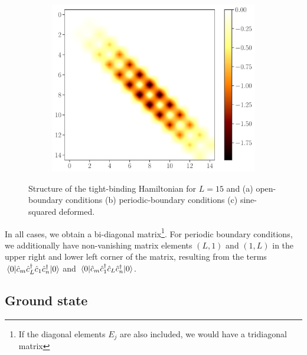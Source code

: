 \documentclass[11pt, a4paper, oneside]{book}
\theoremstyle{definition} %
\begin{document}
\begin{figure}[h]
\begin{subfigure}[b]{0.31\textwidth}
			\includegraphics[width = \textwidth]{ColorMapMatrix_SSD}	
			\caption{}
		\end{subfigure}
		\caption{Structure of the tight-binding Hamiltonian for $L = 15$ and (a) open-boundary conditions (b) periodic-boundary conditions (c) sine-squared deformed.}
		\label{fig:matrix_representation_Hamiltonian}
\end{figure}
In all cases, we obtain a bi-diagonal matrix\footnote{If the diagonal elements $E_j$ are also included, we would have a tridiagonal matrix}. For periodic boundary conditions, we additionally have non-vanishing matrix elements $(L, 1)$ and $(1,L)$ in the upper right and lower left corner of the matrix, resulting from the terms $\mel{0}{\hat{c}_m \hat{c}_L^\dagger \hat{c}_1 \hat{c}_n^\dagger}{0}$ and $\mel{0}{\hat{c}_m \hat{c}_1^\dagger \hat{c}_L \hat{c}_n^\dagger}{0}$. 

\subsection{Ground state}
\end{document}
